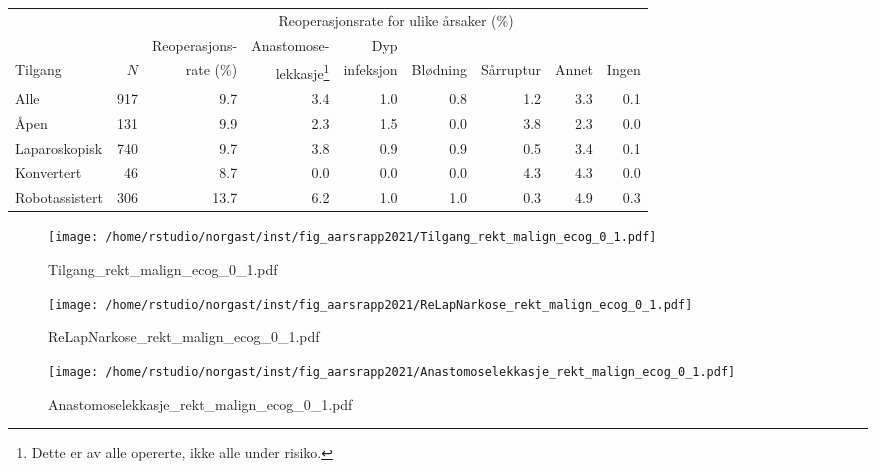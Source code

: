 \documentclass[norsk,a4paper]{article}\usepackage[]{graphicx}\usepackage[]{color}
\begin{document}
\begin{table}[htb]
\begin{minipage}{\textwidth}
\centering
\begin{tabular}{lrrrrrrrr}
  \toprule
  & & & \multicolumn{4}{c}{Reoperasjonsrate for ulike årsaker (\%)} \\
 \cline{4-9} 
 & & Reoperasjons- & Anastomose- & Dyp &&&&  \\
 Tilgang & $N$ & rate (\%) & lekkasje\footnote[2]{Dette er av alle opererte, ikke
alle under risiko.} & infeksjon & Blødning & Sårruptur & Annet & Ingen \\
 \midrule
Alle & 917 & 9.7 & 3.4 & 1.0 & 0.8 & 1.2 & 3.3 & 0.1 \\ 
  Åpen & 131 & 9.9 & 2.3 & 1.5 & 0.0 & 3.8 & 2.3 & 0.0 \\ 
  Laparoskopisk & 740 & 9.7 & 3.8 & 0.9 & 0.9 & 0.5 & 3.4 & 0.1 \\ 
  Konvertert & 46 & 8.7 & 0.0 & 0.0 & 0.0 & 4.3 & 4.3 & 0.0 \\ 
  Robotassistert & 306 & 13.7 & 6.2 & 1.0 & 1.0 & 0.3 & 4.9 & 0.3 \\ 
   \bottomrule
\end{tabular}

\end{minipage}
\end{table}





\begin{figure}[ht]
\centering
\texttt{[image: /home/rstudio/norgast/inst/fig\_aarsrapp2021/Tilgang\_rekt\_malign\_ecog\_0\_1.pdf]}
\caption{Tilgang\_rekt\_malign\_ecog\_0\_1.pdf}
\end{figure}

\begin{figure}[ht]
\centering
\texttt{[image: /home/rstudio/norgast/inst/fig\_aarsrapp2021/ReLapNarkose\_rekt\_malign\_ecog\_0\_1.pdf]}
\caption{ReLapNarkose\_rekt\_malign\_ecog\_0\_1.pdf}
\end{figure}

\begin{figure}[ht]
\centering
\texttt{[image: /home/rstudio/norgast/inst/fig\_aarsrapp2021/Anastomoselekkasje\_rekt\_malign\_ecog\_0\_1.pdf]}
\caption{Anastomoselekkasje\_rekt\_malign\_ecog\_0\_1.pdf}
\end{figure}
\end{document}
